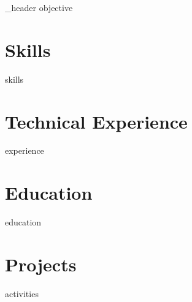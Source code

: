 \documentclass[letter,12pt]{article}
\author{Luis Ontaneda Mijares} %
\begin{document}
{_header}
{objective}

\section{Skills}
{skills}

\section{Technical Experience}
{experience}

\section{Education}
{education}


\section{Projects}
{activities}
\end{document}

